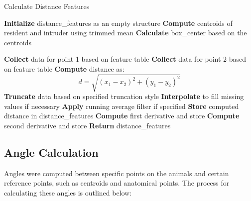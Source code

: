 \documentclass[12pt,english]{article}
\begin{document}
\begin{algorithm}
\caption{Calculate Distance Features}
\begin{algorithmic}[1]
\State \textbf{Initialize} distance\_features as an empty structure
\State \textbf{Compute} centroids of resident and intruder using trimmed mean
\State \textbf{Calculate} box\_center based on the centroids

        \State \textbf{Collect} data for point 1 based on feature table
        \State \textbf{Collect} data for point 2 based on feature table
        \State \textbf{Compute} distance as:
        \[
        d = \sqrt{(x_1 - x_2)^2 + (y_1 - y_2)^2}
        \]
        \State \textbf{Truncate} data based on specified truncation style
        \State \textbf{Interpolate} to fill missing values if necessary
        \State \textbf{Apply} running average filter if specified
        \State \textbf{Store} computed distance in distance\_features
            \State \textbf{Compute} first derivative and store
                \State \textbf{Compute} second derivative and store
            \EndIf
        \EndIf
    \EndIf
\EndFor
\State \textbf{Return} distance\_features
\end{algorithmic}
\end{algorithm}




\newpage
\subsection
{Angle Calculation}
Angles were computed between specific points on the animals and certain reference points, such as centroids and anatomical points. The process for calculating these angles is outlined below:
\end{document}
